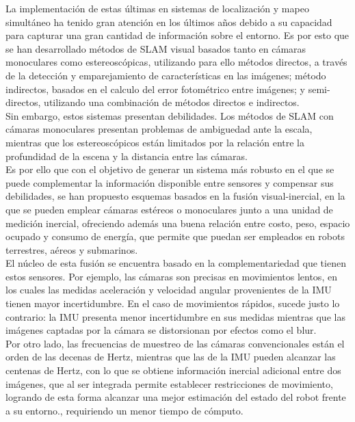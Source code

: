La implementación de estas últimas en sistemas de localización y mapeo simultáneo ha tenido gran atención en los últimos años debido a su capacidad para capturar una gran cantidad de información sobre el entorno. Es por esto que se han desarrollado métodos de SLAM visual basados tanto en cámaras monoculares como estereoscópicas, utilizando para ello métodos directos, a través de la detección y emparejamiento de características en las imágenes; método indirectos, basados en el calculo del error fotométrico entre imágenes; y semi-directos, utilizando una combinación de métodos directos e indirectos.\\

Sin embargo, estos sistemas presentan debilidades. Los métodos de SLAM con cámaras monoculares presentan problemas de ambiguedad ante la escala, mientras que  los estereoscópicos están limitados por la relación entre la profundidad de la escena y la distancia entre las cámaras. \\

Es por ello que con el objetivo de generar un sistema más robusto en el que se puede complementar la información disponible entre sensores y compensar sus debilidades, se han propuesto esquemas basados en la fusión visual-inercial, en la que se pueden emplear cámaras estéreos o monoculares junto a una unidad de medición inercial, ofreciendo además una buena relación entre costo, peso, espacio ocupado y consumo de energía, que permite que puedan ser empleados en robots terrestres, aéreos y submarinos.\\

El núcleo de esta fusión se encuentra basado en la complementariedad que tienen estos sensores. Por ejemplo, las cámaras son precisas en movimientos lentos, en los cuales las medidas aceleración y velocidad angular provenientes de la IMU tienen mayor incertidumbre. En el caso de movimientos rápidos, sucede justo lo contrario: la IMU presenta menor incertidumbre en sus medidas mientras que las imágenes captadas por la cámara se distorsionan por efectos como el blur. \\

Por otro lado,  las frecuencias de muestreo de las cámaras convencionales están el orden de las decenas de Hertz, mientras que las de la IMU pueden alcanzar las centenas de Hertz, con lo que se  obtiene información inercial adicional entre dos imágenes, que al ser integrada permite establecer restricciones de movimiento,  logrando de esta forma alcanzar una mejor estimación del estado del robot frente a su entorno., requiriendo un menor tiempo de cómputo. \\



